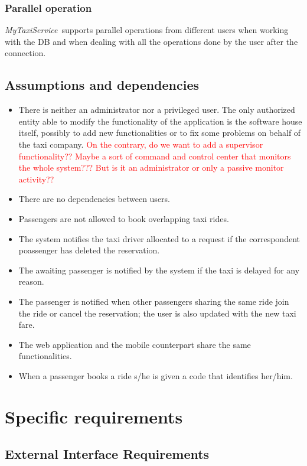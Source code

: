 \documentclass[a4paper,11pt]{report} %
\newcommand{\mts}{\mbox{\normalfont\itshape MyTaxiService\ }}
\begin{document}
	\subsubsection{Parallel operation} \mts supports parallel operations from different users when working	with the DB and when dealing with all the operations done by the user after the connection.
	
	\subsection{Assumptions and dependencies}
		\begin{itemize}
			\item There is neither an administrator nor a privileged user. The only authorized entity able to modify the functionality of the application is the software house itself, possibly to add new functionalities or to fix some problems on behalf of the taxi company. \textcolor{red}{On the contrary, do we want to add a supervisor functionality?? Maybe a sort of command and control center that monitors the whole system??? But is it an administrator or only a passive monitor activity??}
			\item There are no dependencies between users.
			\item Passengers are not allowed to book overlapping taxi rides.
			\item The system notifies the taxi driver allocated to a request if the correspondent poassenger has deleted the reservation.
			\item The awaiting passenger is notified by the system if the taxi is delayed for any reason.
			\item The passenger is notified when other passengers sharing the same ride join the ride or cancel the reservation; the user is also updated with the new taxi fare.
			\item The web application and the mobile counterpart share the same functionalities.
			\item When a passenger books a ride s/he is given a code that identifies her/him.
		\end{itemize}
	
	
	
	\section{Specific requirements}
	
	\subsection{External Interface Requirements}
	
\end{document}
